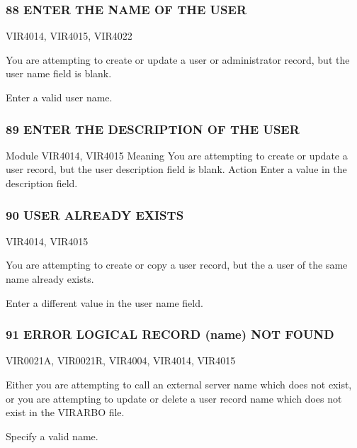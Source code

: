 \documentclass[letterpaper,10pt,english]{sphinxmanual}
\begin{document}
\subsubsection{88 ENTER THE NAME OF THE USER}
\label{\detokenize{messages:enter-the-name-of-the-user}}\begin{description}
\sphinxAtStartPar
VIR4014, VIR4015, VIR4022

\sphinxAtStartPar
You are attempting to create or update a user or administrator record, but the user name field is blank.

\sphinxAtStartPar
Enter a valid user name.

\end{description}


\subsubsection{89 ENTER THE DESCRIPTION OF THE USER}
\label{\detokenize{messages:enter-the-description-of-the-user}}
\sphinxAtStartPar
Module
VIR4014, VIR4015
Meaning
You are attempting to create or update a user record, but the user description field is blank.
Action
Enter a value in the description field.


\subsubsection{90 USER ALREADY EXISTS}
\label{\detokenize{messages:user-already-exists}}\begin{description}
\sphinxAtStartPar
VIR4014, VIR4015

\sphinxAtStartPar
You are attempting to create or copy a user record, but the a user of the same name already exists.

\sphinxAtStartPar
Enter a different value in the user name field.

\end{description}


\subsubsection{91 ERROR LOGICAL RECORD (name) NOT FOUND}
\label{\detokenize{messages:error-logical-record-name-not-found}}\begin{description}
\sphinxAtStartPar
VIR0021A, VIR0021R, VIR4004, VIR4014, VIR4015

\sphinxAtStartPar
Either you are attempting to call an external server name which does not exist, or you are attempting to update or delete a user record name which does not exist in the VIRARBO file.

\sphinxAtStartPar
Specify a valid name.

\end{description}
\end{document}
